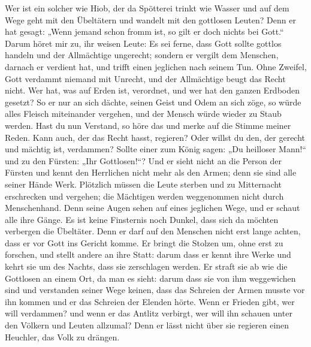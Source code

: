  Wer ist ein solcher wie Hiob, der da Spötterei trinkt wie
Wasser  und auf dem Wege geht mit den Übeltätern und
wandelt mit den gottlosen Leuten?  Denn er hat gesagt:
„Wenn jemand schon fromm ist, so gilt er doch nichts bei Gott.``
 Darum höret mir zu, ihr weisen Leute: Es sei ferne, dass
Gott sollte gottlos handeln und der Allmächtige ungerecht;
 sondern er vergilt dem Menschen, darnach er verdient
hat, und trifft einen jeglichen nach seinem Tun.  Ohne
Zweifel, Gott verdammt niemand mit Unrecht, und der Allmächtige beugt
das Recht nicht.  Wer hat, was auf Erden ist, verordnet,
und wer hat den ganzen Erdboden gesetzt?  So er nur an
sich dächte, seinen Geist und Odem an sich zöge,  so
würde alles Fleisch miteinander vergehen, und der Mensch würde wieder zu
Staub werden.  Hast du nun Verstand, so höre das und
merke auf die Stimme meiner Reden.  Kann auch, der das
Recht hasst, regieren? Oder willst du den, der gerecht und mächtig ist,
verdammen?  Sollte einer zum König sagen: „Du heilloser
Mann!{}`` und zu den Fürsten: „Ihr Gottlosen!{}``?  Und
er sieht nicht an die Person der Fürsten und kennt den Herrlichen nicht
mehr als den Armen; denn sie sind alle seiner Hände Werk.
 Plötzlich müssen die Leute sterben und zu Mitternacht
erschrecken und vergehen; die Mächtigen werden weggenommen nicht durch
Menschenhand.  Denn seine Augen sehen auf eines jeglichen
Wege, und er schaut alle ihre Gänge.  Es ist keine
Finsternis noch Dunkel, dass sich da möchten verbergen die Übeltäter.
 Denn er darf auf den Menschen nicht erst lange achten,
dass er vor Gott ins Gericht komme.  Er bringt die
Stolzen um, ohne erst zu forschen, und stellt andere an ihre Statt:
 darum dass er kennt ihre Werke und kehrt sie um des
Nachts, dass sie zerschlagen werden.  Er straft sie ab
wie die Gottlosen an einem Ort, da man es sieht:  darum
dass sie von ihm weggewichen sind und verstanden seiner Wege keinen,
 dass das Schreien der Armen musste vor ihn kommen und er
das Schreien der Elenden hörte.  Wenn er Frieden gibt,
wer will verdammen? und wenn er das Antlitz verbirgt, wer will ihn
schauen unter den Völkern und Leuten allzumal?  Denn er
lässt nicht über sie regieren einen Heuchler, das Volk zu drängen.

